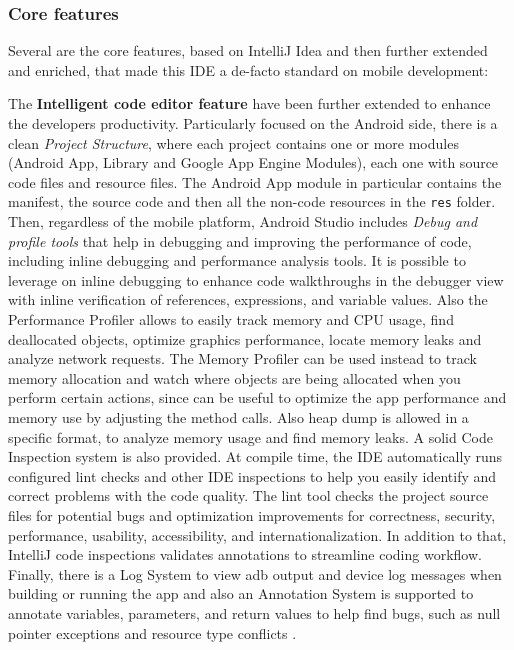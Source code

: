 \newpage
\subsubsection{Core features}
Several are the core features, based on IntelliJ Idea and then further extended and enriched, that made this IDE a de-facto standard on mobile development:

\noindent The \textbf{Intelligent code editor feature} have been further extended to enhance the developers productivity. Particularly focused on the Android side, there is a clean \textit{Project Structure}, where each project contains one or more modules (Android App, Library and Google App Engine Modules), each one with source code files and resource files. The Android App module in particular contains the manifest, the source code and then all the non-code resources in the \texttt{res} folder. Then, regardless of the mobile platform, Android Studio includes \textit{Debug and profile tools} that help in debugging and improving the performance of code, including inline debugging and performance analysis tools. It is possible to leverage on inline debugging to enhance code walkthroughs in the debugger view with inline verification of references, expressions, and variable values. Also the Performance Profiler allows to easily track memory and CPU usage, find deallocated objects, optimize graphics performance, locate memory leaks and analyze network requests. The Memory Profiler can be used instead to track memory allocation and watch where objects are being allocated when you perform certain actions, since can be useful to optimize the app performance and memory use by adjusting the method calls. Also heap dump is allowed in a specific format, to analyze memory usage and find memory leaks. A solid Code Inspection system is also provided. At compile time, the IDE automatically runs configured lint checks and other IDE inspections to help you easily identify and correct problems with the code quality. The lint tool checks the project source files for potential bugs and optimization improvements for correctness, security, performance, usability, accessibility, and internationalization. In addition to that, IntelliJ code inspections validates annotations to streamline coding workflow. Finally, there is a Log System to view adb output and device log messages when building or running the app and also an Annotation System is supported to annotate variables, parameters, and return values to help find bugs, such as null pointer exceptions and resource type conflicts \cite{AndroidStudioCodeEditorFeature}.

